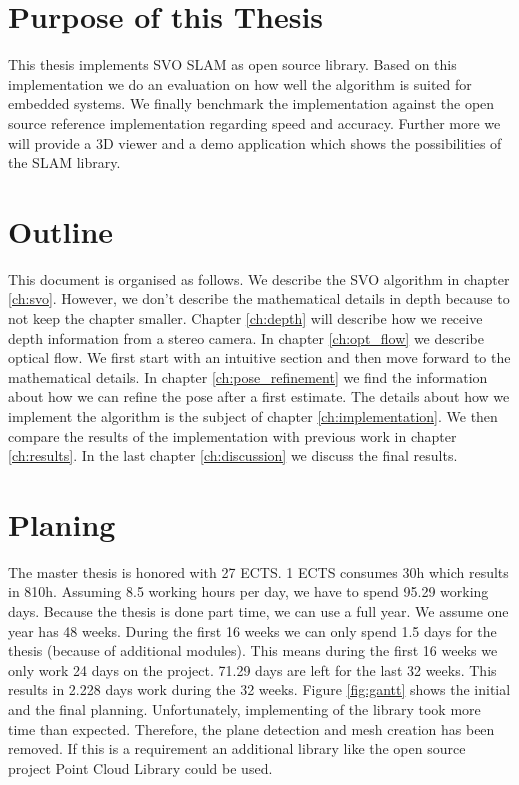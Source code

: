 \documentclass[11pt,a4paper,titlepage,oneside]{report}
\begin{document}
\section{Purpose of this Thesis}

This thesis implements SVO SLAM as open source library. Based on this implementation we do an evaluation on how well the algorithm is suited for embedded systems. We finally benchmark the implementation against the open source reference implementation regarding speed and accuracy. Further more we will provide a 3D viewer and a demo application which shows the possibilities of the SLAM library.

\section{Outline}

This document is organised as follows. We describe the SVO algorithm in chapter \ref{ch:svo}. However, we don't describe the mathematical details in depth because to not keep the chapter smaller. Chapter \ref{ch:depth} will describe how we receive depth information from a stereo camera. In chapter \ref{ch:opt_flow} we describe optical flow. We first start with an intuitive section and then move forward to the mathematical details. In chapter \ref{ch:pose_refinement} we find the information about how we can refine the pose after a first estimate. The details about how we implement the algorithm is the subject of chapter \ref{ch:implementation}. We then compare the results of the implementation with previous work in chapter \ref{ch:results}. In the last chapter \ref{ch:discussion} we discuss the final results.

\section{Planing}
The master thesis is honored with 27 ECTS. 1 ECTS consumes 30h which results in 810h. Assuming 8.5 working hours per day, we have to spend 95.29 working days. Because the thesis is done part time, we can use a full year. We assume one year has 48 weeks. During the first 16 weeks we can only spend 1.5 days for the thesis (because of additional modules). This means during the first 16 weeks we only work 24 days on the project. 71.29 days are left for the last 32 weeks. This results in 2.228 days work during the 32 weeks. Figure \ref{fig:gantt} shows the initial and the final planning. Unfortunately, implementing of the library took more time than expected. Therefore, the plane detection and mesh creation has been removed. If this is a requirement an additional library like the open source project Point Cloud Library \cite{pcl} could be used.
\end{document}
